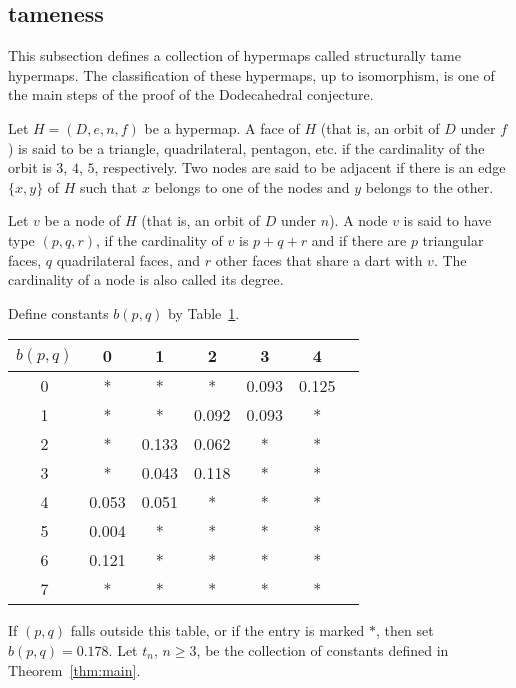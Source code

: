 \subsection{tameness}

This subsection defines a collection of hypermaps called structurally tame hypermaps.
The classification of these hypermaps, up to isomorphism, is one of the main steps
of the proof of the Dodecahedral conjecture.

Let $H=(D,e,n,f)$ be a hypermap.  A face of $H$ (that is, an orbit
of $D$ under $f$) is said to be a triangle, quadrilateral, pentagon, etc. if the cardinality
of the orbit is $3$, $4$, $5$, respectively.  Two nodes are said
to be adjacent
if there is an edge $\{x,y\}$ of $H$ such that $x$ belongs to one of the nodes and
$y$ belongs to the other.

  Let $v$ be a node of $H$ (that is, an orbit
of $D$ under $n$).  
A node $v$ is said to have type $(p,q,r)$, if the cardinality of $v$ is $p+q+r$ and if
there are $p$ triangular faces, $q$ quadrilateral faces, and $r$ other faces
that share a dart with $v$.  The cardinality of a node is also
called its degree.

Define constants $b(p,q)$ by Table~\ref{vertexTable}.
\begin{centering}
\begin{table}
\label{vertexTable}
\begin{tabular}{|c|c|c|c|c|c|c|} 
\hline
$b(p,q)$ & 0 & 1 & 2 & 3 & 4 \\
\hline
0 & * & * & * & 0.093 & 0.125  \\
1 & * & * & 0.092 & 0.093 & *  \\
2 & * & 0.133 & 0.062 & * & *  \\
3 & * & 0.043 & 0.118 & * & *  \\
4 & 0.053 & 0.051 & * & * & *  \\
5 & 0.004 & * & * & * & *  \\
6 & 0.121 & * & * & * & * \\
7 & * & * & * & * & * \\
\hline
\end{tabular}
\end{table}
\end{centering}
If $(p,q)$ falls outside this table, or if the entry is marked $*$, then
set $b(p,q)=0.178$.
Let $t_n$, $n\ge3$, be the collection of constants defined in Theorem~\ref{thm:main}.

